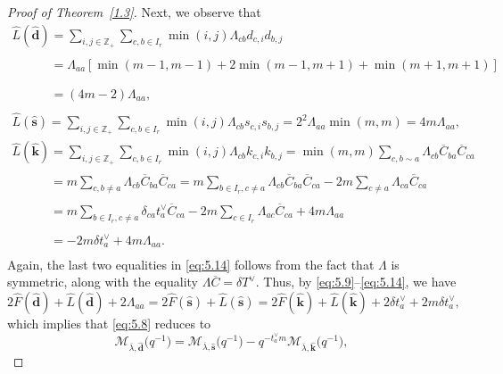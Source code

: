 \documentclass[10pt,a4paper]{amsart}
\numberwithin{equation}{section}
\begin{document}
\begin{proof}[Proof of Theorem~\ref{1.3}]
Next, we observe that
\begin{gather}%
\widehat{L}(\widehat{\mathbf{d}})
=\sum_{i,j\in\mathbb{Z}_+}\sum_{c,b\in I_r}\min(i,j)\Lambda_{cb}d_{c,i}d_{b,j}\nonumber\\
\phantom{\widehat{L}(\widehat{\mathbf{d}})}{}
=\Lambda_{aa}[\min(m-1,m-1)+2\min(m-1,m+1)+\min(m+1,m+1)]\nonumber\\
\phantom{\widehat{L}(\widehat{\mathbf{d}})}{}=(4m-2)\Lambda_{aa},\\
\widehat{L}(\widehat{\mathbf{s}})
=\sum_{i,j\in\mathbb{Z}_+}\sum_{c,b\in I_r}\min(i,j)\Lambda_{cb}s_{c,i}s_{b,j}
=2^2\Lambda_{aa}\min(m,m)
=4m\Lambda_{aa},\\
\widehat{L}(\widehat{\mathbf{k}})
=\sum_{i,j\in\mathbb{Z}_+}\sum_{c,b\in I_r}\min(i,j)\Lambda_{cb}k_{c,i}k_{b,j}
=\min(m,m)\sum_{c,b\sim a}\Lambda_{cb}\overline{C}_{ba}\overline{C}_{ca}\nonumber\\
\phantom{\widehat{L}(\widehat{\mathbf{k}})}{}
=m\sum_{c,b\neq a}\Lambda_{cb}\overline{C}_{ba}\overline{C}_{ca}
=m\sum_{b\in I_r,c\neq a}\Lambda_{cb}\overline{C}_{ba}\overline{C}_{ca}-2m\sum_{c\neq a}\Lambda_{ca}\overline{C}_{ca}\nonumber\\
\phantom{\widehat{L}(\widehat{\mathbf{k}})}{}=m\sum_{b\in I_r,c\neq a}\delta_{ca}t_a^{\vee}\overline{C}_{ca}-2m\sum_{c\in I_r}\Lambda_{ac}\overline{C}_{ca}+4m\Lambda_{aa}\nonumber\\
\phantom{\widehat{L}(\widehat{\mathbf{k}})}{}=-2m\delta t_a^{\vee}+4m\Lambda_{aa}.\label{eq:5.14}
\end{gather}
Again, the last two equalities in \eqref{eq:5.14} follows from the fact that $\Lambda$ is symmetric, along with the equality $\Lambda\overline{C}=\delta T^{\vee}$. Thus, by \eqref{eq:5.9}--\eqref{eq:5.14}, we have
\begin{equation*}
2\widehat{F}(\widehat{\mathbf{d}})+\widehat{L}(\widehat{\mathbf{d}})+2\Lambda_{aa}
=2\widehat{F}(\widehat{\mathbf{s}})+\widehat{L}(\widehat{\mathbf{s}})
=2\widehat{F}(\widehat{\mathbf{k}})+\widehat{L}(\widehat{\mathbf{k}})+2\delta t_a^{\vee}+2m\delta t_a^{\vee},
\end{equation*}
which implies that \eqref{eq:5.8} reduces to
\begin{equation*}
\mathcal{M}_{\overline{\lambda},\widehat{\mathbf{d}}}\bigl(q^{-1}\bigr)
=\mathcal{M}_{\overline{\lambda},\widehat{\mathbf{s}}}\bigl(q^{-1}\bigr)
-q^{-t_a^{\vee}m}\mathcal{M}_{\overline{\lambda},\widehat{\mathbf{k}}}\bigl(q^{-1}\bigr),
\end{equation*}

\end{proof}
\end{document}

